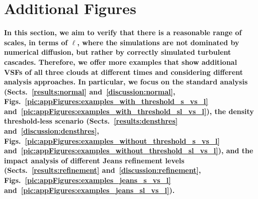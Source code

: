 \newpage

\section{Additional Figures}\label{appFigures}

\textbf{
    In this section, we aim to verify that there is a reasonable range of scales, in terms of $\ell$, where the simulations are not dominated by numerical diffusion, but rather by correctly simulated turbulent cascades.
    Therefore, we offer more examples that show additional VSFs of all three clouds at different times and considering different analysis approaches.
    In particular, we focus on the standard analysis (Sects.~\ref{results:normal} and~\ref{discussion:normal}, Figs.~\ref{pic:appFigures:examples_with_threshold_s_vs_l} and~\ref{pic:appFigures:examples_with_threshold_sl_vs_l}), the density threshold-less scenario (Sects.~\ref{results:densthres} and~\ref{discussion:densthres}, Figs.~\ref{pic:appFigures:examples_without_threshold_s_vs_l} and~\ref{pic:appFigures:examples_without_threshold_sl_vs_l}), and the impact analysis of different Jeans refinement levels (Sects.~\ref{results:refinement} and~\ref{discussion:refinement}, Figs.~\ref{pic:appFigures:examples_jeans_s_vs_l} and~\ref{pic:appFigures:examples_jeans_sl_vs_l}).
}
 	
